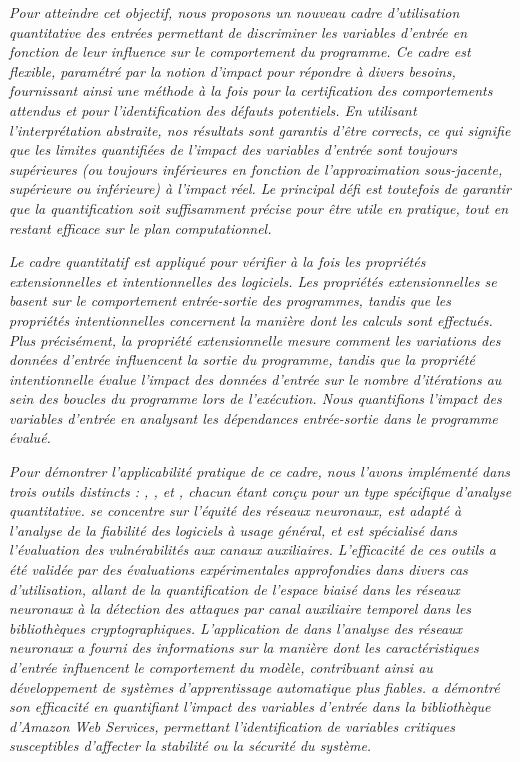   \emph{Pour atteindre cet objectif, nous proposons un nouveau cadre d'utilisation quantitative des entrées permettant de discriminer les variables d'entrée en fonction de leur influence sur le comportement du programme. Ce cadre est flexible, paramétré par la notion d'impact pour répondre à divers besoins, fournissant ainsi une méthode à la fois pour la certification des comportements attendus et pour l'identification des défauts potentiels. En utilisant l'interprétation abstraite, nos résultats sont garantis d'être corrects, ce qui signifie que les limites quantifiées de l'impact des variables d'entrée sont toujours supérieures (ou toujours inférieures en fonction de l'approximation sous-jacente, supérieure ou inférieure) à l'impact réel. Le principal défi est toutefois de garantir que la quantification soit suffisamment précise pour être utile en pratique, tout en restant efficace sur le plan computationnel.}

  \emph{Le cadre quantitatif est appliqué pour vérifier à la fois les propriétés extensionnelles et intentionnelles des logiciels. Les propriétés extensionnelles se basent sur le comportement entrée-sortie des programmes, tandis que les propriétés intentionnelles concernent la manière dont les calculs sont effectués. Plus précisément, la propriété extensionnelle mesure comment les variations des données d'entrée influencent la sortie du programme, tandis que la propriété intentionnelle évalue l'impact des données d'entrée sur le nombre d'itérations au sein des boucles du programme lors de l'exécution. Nous quantifions l'impact des variables d'entrée en analysant les dépendances entrée-sortie dans le programme évalué.}

  \emph{Pour démontrer l'applicabilité pratique de ce cadre, nous l'avons implémenté dans trois outils distincts : \libra, \impatto, et \timesec, chacun étant conçu pour un type spécifique d'analyse quantitative. \libra{} se concentre sur l'équité des réseaux neuronaux, \impatto{} est adapté à l'analyse de la fiabilité des logiciels à usage général, et \timesec{} est spécialisé dans l'évaluation des vulnérabilités aux canaux auxiliaires. L'efficacité de ces outils a été validée par des évaluations expérimentales approfondies dans divers cas d'utilisation, allant de la quantification de l'espace biaisé dans les réseaux neuronaux à la détection des attaques par canal auxiliaire temporel dans les bibliothèques cryptographiques. L'application de \libra{} dans l'analyse des réseaux neuronaux a fourni des informations sur la manière dont les caractéristiques d'entrée influencent le comportement du modèle, contribuant ainsi au développement de systèmes d'apprentissage automatique plus fiables. \timesec{} a démontré son efficacité en quantifiant l'impact des variables d'entrée dans la bibliothèque \bignum{} d'Amazon Web Services, permettant l'identification de variables critiques susceptibles d'affecter la stabilité ou la sécurité du système.}

